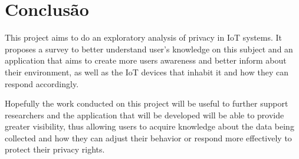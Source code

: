 \documentclass[conference]{IEEEtran}
\begin{document}
\section{Conclusão}

This project aims to do an exploratory analysis of privacy in IoT systems.
It proposes a survey to better understand user's knowledge on this subject
and an application that aims to create more users awareness and better inform
about their environment, as well as the IoT devices that inhabit it and
how they can respond accordingly.

Hopefully the work conducted on this project will be useful to further support
researchers and the application that will be developed will be able to
provide greater visibility, thus allowing users to acquire knowledge about
the data being collected and how they can adjust their behavior or respond
more effectively to protect their privacy rights.



\end{document}

